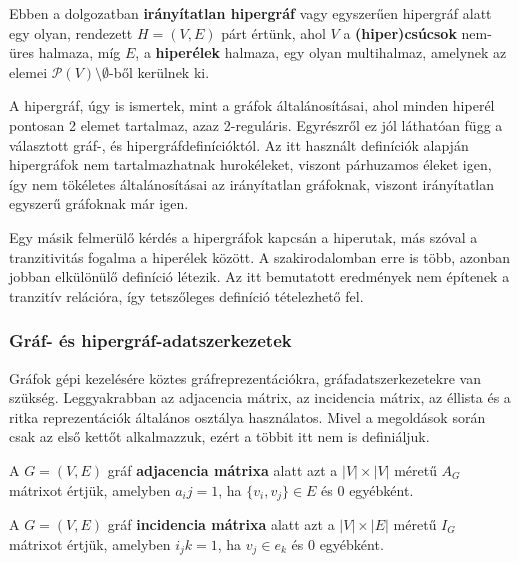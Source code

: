 \begin{definition}
Ebben a dolgozatban \textbf{irányítatlan hipergráf} vagy egyszerűen hipergráf alatt egy olyan, rendezett $H=(V,E)$ párt értünk, ahol $V$ a \textbf{(hiper)csúcsok} nem-üres halmaza, míg $E$, a \textbf{hiperélek} halmaza, egy olyan multihalmaz, amelynek az elemei $\mathcal{P}(V) \setminus \emptyset$-ből kerülnek ki.
\end{definition}

\begin{note}
A hipergráf, úgy is ismertek, mint a gráfok általánosításai, ahol minden hiperél pontosan 2 elemet tartalmaz, azaz 2-reguláris. Egyrészről ez jól láthatóan függ a választott gráf-, és hipergráfdefinícióktól. Az itt használt definíciók alapján hipergráfok nem tartalmazhatnak hurokéleket, viszont párhuzamos éleket igen, így nem tökéletes általánosításai az irányítatlan gráfoknak, viszont irányítatlan egyszerű gráfoknak már igen.
\end{note}

\begin{note}
Egy másik felmerülő kérdés a hipergráfok kapcsán a hiperutak, más szóval a tranzitivitás fogalma a hiperélek között. A szakirodalomban erre is több, azonban jobban elkülönülő definíció létezik. Az itt bemutatott eredmények nem építenek a tranzitív relációra, így tetszőleges definíció tételezhető fel.
\end{note}

\subsubsection{Gráf- és hipergráf-adatszerkezetek}

Gráfok gépi kezelésére köztes gráfreprezentációkra, gráfadatszerkezetekre van szükség. Leggyakrabban az adjacencia mátrix, az incidencia mátrix, az éllista és a ritka reprezentációk általános osztálya használatos. Mivel a megoldások során csak az első kettőt alkalmazzuk, ezért a többit itt nem is definiáljuk.

\begin{definition}
A $G=(V,E)$ gráf \textbf{adjacencia mátrixa} alatt azt a $|V| \times |V|$ méretű $A_G$ mátrixot értjük, amelyben $a_ij=1$, ha $\{v_i, v_j\} \in E$ és 0 egyébként.
\end{definition}

\begin{definition}
A $G=(V,E)$ gráf \textbf{incidencia mátrixa} alatt azt a $|V| \times |E|$ méretű $I_G$ mátrixot értjük, amelyben $i_jk=1$, ha $v_j \in e_k$ és 0 egyébként.
\end{definition}

